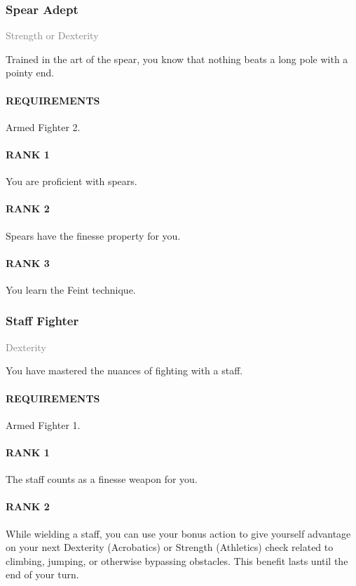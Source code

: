 \subsubsection{Spear Adept} \label{feat::spearadept}
\small{\textcolor{gray}{Strength or Dexterity}}

\normalsize
Trained in the art of the spear, you know that nothing beats a long pole with a pointy end.
\paragraph{REQUIREMENTS} Armed Fighter 2.
\paragraph{RANK 1} You are proficient with spears.
\paragraph{RANK 2} Spears have the finesse property for you.
\paragraph{RANK 3} You learn the Feint technique.

\subsubsection{Staff Fighter} \label{feat::stafffighter}
\small{\textcolor{gray}{Dexterity}}

\normalsize
You have mastered the nuances of fighting with a staff.
\paragraph{REQUIREMENTS} Armed Fighter 1.
\paragraph{RANK 1} The staff counts as a finesse weapon for you.
\paragraph{RANK 2} While wielding a staff, you can use your bonus action to give yourself advantage on your next Dexterity (Acrobatics) or Strength (Athletics) check related to climbing, jumping, or otherwise bypassing obstacles.
This benefit lasts until the end of your turn.
